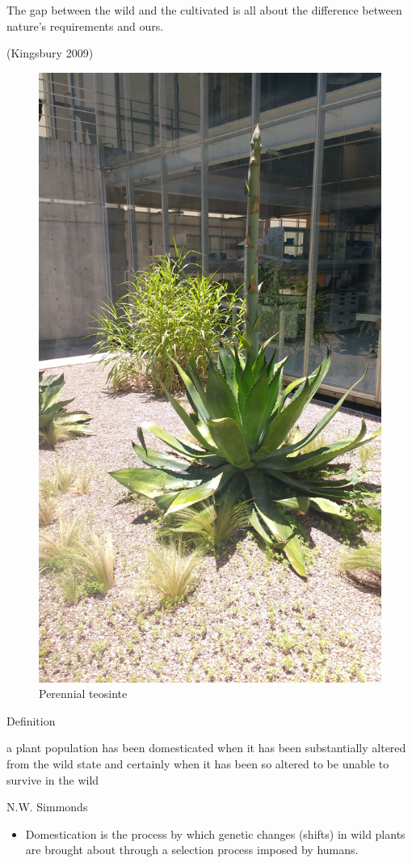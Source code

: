 \documentclass[ignorenonframetext,aspectratio=169]{beamer}
\providecommand{\tightlist}{%
  \setlength{\itemsep}{0pt}\setlength{\parskip}{0pt}}
\begin{document}
\begin{frame}{}
\protect\hypertarget{section}{}

\begin{block}{}
The gap between the wild and the cultivated is all about the difference between nature's requirements and ours.
\end{block}

(Kingsbury 2009)

\end{frame}

\begin{frame}{}
\protect\hypertarget{section-1}{}

\begin{figure}

{\centering \includegraphics[width=0.26\linewidth]{./../images/Perennial_teosinte} 

}

\caption{Perennial teosinte}\label{fig:weed-vs-crop}
\end{figure}

\end{frame}

\begin{frame}{Definition}
\protect\hypertarget{definition}{}

\begin{block}{}
a plant population has been domesticated when it has been substantially altered from the wild state and certainly when it has been so altered to be unable to survive in the wild
\end{block}

N.W. Simmonds

\begin{itemize}
\tightlist
\item
  Domestication is the process by which genetic changes (shifts) in wild
  plants are brought about through a selection process imposed by
  humans.
\end{itemize}

\end{frame}
\end{document}
